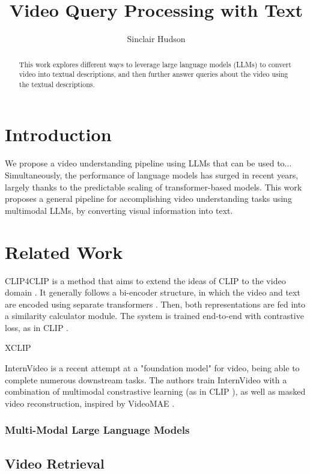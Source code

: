 \documentclass{article}
\title{Video Query Processing with Text}
\author{Sinclair Hudson}
\begin{document}
\maketitle

\begin{abstract}
      This work explores different ways to leverage large language models (LLMs) to convert video into textual descriptions, and then further answer queries about the video using the textual descriptions.
\end{abstract}

\section{Introduction}

We propose a video understanding pipeline using LLMs that can be used to...
Simultaneously, the performance of language models has surged in recent years, largely thanks to the predictable scaling of transformer-based models.
This work proposes a general pipeline for accomplishing video understanding tasks using multimodal LLMs, by converting visual information into text.

\section{Related Work}

CLIP4CLIP is a method that aims to extend the ideas of CLIP \cite{clip} to the video domain \cite{clip4clip}.
It generally follows a bi-encoder structure, in which the video and text are encoded using separate transformers \cite{transformer}. Then, both representations are fed into a similarity calculator module.
The system is trained end-to-end with contrastive loss, as in CLIP \cite{clip}.

XCLIP \cite{xclip}

InternVideo is a recent attempt at a "foundation model" for video, being able to complete numerous downstream tasks.
The authors train InternVideo with a combination of multimodal constrastive learning (as in CLIP \cite{clip}), as well as masked video reconstruction, inspired by VideoMAE \cite{videomae}.


\subsubsection{Multi-Modal Large Language Models}

\subsection{Video Retrieval}
\end{document}

